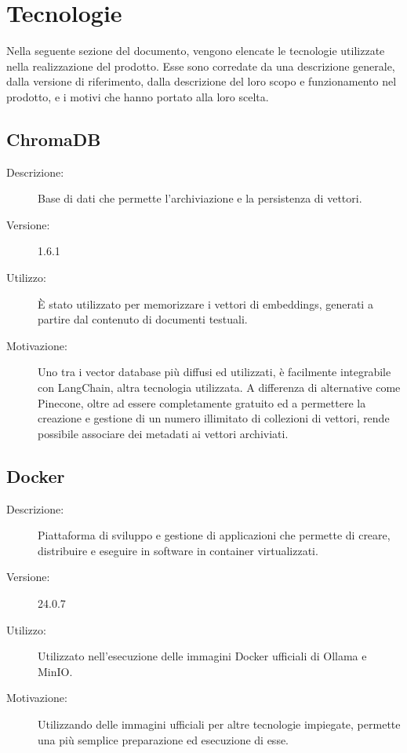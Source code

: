 \chapter{Tecnologie} \label{cap:tech}
Nella seguente sezione del documento, vengono elencate le tecnologie utilizzate nella realizzazione del prodotto. Esse sono corredate da una descrizione generale, dalla versione di riferimento, dalla descrizione del loro scopo e funzionamento nel prodotto, e i motivi che hanno portato alla loro scelta.

\section{ChromaDB}
\begin{description}
\item[Descrizione:] Base di dati che permette l'archiviazione e la persistenza di vettori.
\item[Versione:] 1.6.1
\item[Utilizzo:] È stato utilizzato per memorizzare i vettori di embeddings, generati a partire dal contenuto di documenti testuali.
\item[Motivazione:] Uno tra i vector database più diffusi ed utilizzati, è facilmente integrabile con LangChain, altra tecnologia utilizzata. A differenza di alternative come Pinecone, oltre ad essere completamente gratuito ed a permettere la creazione e gestione di un numero illimitato di collezioni di vettori, rende possibile associare dei metadati ai vettori archiviati.
\end{description}

\section{Docker}
\begin{description}
\item[Descrizione:] Piattaforma di sviluppo e gestione di applicazioni che permette di creare, distribuire e eseguire in  software in container virtualizzati.
\item[Versione:] 24.0.7
\item[Utilizzo:] Utilizzato nell'esecuzione delle immagini Docker ufficiali di Ollama e MinIO.
\item[Motivazione:] Utilizzando delle immagini ufficiali per altre tecnologie impiegate, permette una più semplice preparazione ed esecuzione di esse.
\end{description}

